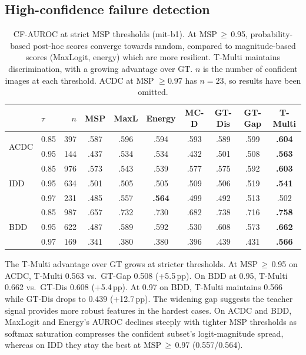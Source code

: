 \documentclass{article}
\newcommand{\win}[1]{\textcolor{wingreen}{\textbf{#1}}}
\newcommand{\loss}[1]{\textcolor{lossred}{#1}}
\begin{document}
\subsection{High-confidence failure detection}


\begin{table}[H]
\centering
\small
\setlength{\tabcolsep}{4pt}
\caption{CF-AUROC at strict MSP thresholds (mit-b1). At MSP$\,{\geq}\,$0.95, probability-based post-hoc scores converge towards random, compared to magnitude-based scores (MaxLogit, energy) which are more resilient. T-Multi maintains discrimination, with a growing advantage over GT. $n$ is the number of confident images at each threshold. ACDC at MSP $\geq 0.97$ has $n=23$, so results have been omitted.}
\label{tab:strict}
 \begin{tabular}{llrccccccc}
\toprule
 & $\tau$ & $n$ & MSP & MaxL & Energy & MC-D & GT-Dis & GT-Gap & \textbf{T-Multi} \\
\midrule
\multirow{2}{*}{ACDC}
 & 0.85 & 397 & \loss{.587} & .596 & .594 & .593 & .589 & .599 & \win{.604} \\
 & 0.95 & 144 & .437 & .534 & .534 & \loss{.432} & .501 & .508 & \win{.563} \\
\midrule
\multirow{3}{*}{IDD}
 & 0.85 & 976 & .573 & \loss{.543} & .539 & .577 & .575 & .592 & \win{.603} \\
 & 0.95 & 634 & \loss{.501} & .505 & .505 & .509 & .506 & .519 & \win{.541} \\
 & 0.97 & 231 & \loss{.485} & .557 & \win{.564} & .499 & .492 & .513 & .502 \\
\midrule
\multirow{3}{*}{BDD}
 & 0.85 & 987 & \loss{.657} & .732 & .730 & .682 & .738 & .716 & \win{.758} \\
 & 0.95 & 622 & \loss{.487} & .589 & .592 & .530 & .608 & .573 & \win{.662} \\
 & 0.97 & 169 & \loss{.341} & .380 & .380 & .396 & .439 & .431 & \win{.566} \\
\bottomrule
\end{tabular}
\end{table}


The T-Multi advantage over GT grows at stricter thresholds. At MSP$\,{\geq}\,$0.95 on ACDC, T-Multi 0.563 vs.\ GT-Gap 0.508 (+5.5\,pp). On BDD at 0.95, T-Multi 0.662 vs.\ GT-Dis 0.608 (+5.4\,pp). At 0.97 on BDD, T-Multi maintains 0.566 while GT-Dis drops to 0.439 (+12.7\,pp). The widening gap suggests the teacher signal provides more robust features in the hardest cases. On ACDC and BDD, MaxLogit and Energy's AUROC declines steeply with tighter MSP thresholds as softmax saturation compresses the confident subset's logit-magnitude spread, whereas on IDD they stay the best at MSP$\,{\geq}\,$0.97 (0.557/0.564).
\end{document}
